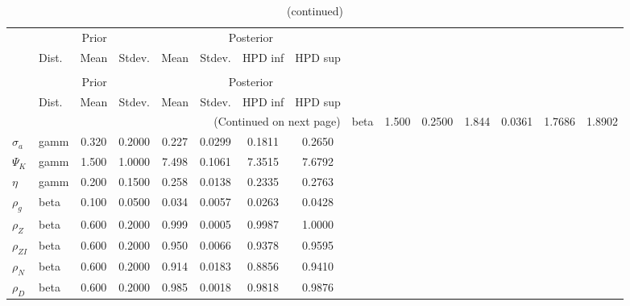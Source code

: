  
\begin{center}
\begin{longtable}{llcccccc} 
\caption{Results from Metropolis-Hastings (parameters)}
 \label{Table:MHPosterior:1}\\
\toprule 
  & \multicolumn{3}{c}{Prior}  &  \multicolumn{4}{c}{Posterior} \\
  \cmidrule(r{.75em}){2-4} \cmidrule(r{.75em}){5-8}
  & Dist. & Mean  & Stdev. & Mean & Stdev. & HPD inf & HPD sup\\
\midrule \endfirsthead 
\caption{(continued)}\\\toprule 
  & \multicolumn{3}{c}{Prior}  &  \multicolumn{4}{c}{Posterior} \\
  \cmidrule(r{.75em}){2-4} \cmidrule(r{.75em}){5-8}
  & Dist. & Mean  & Stdev. & Mean & Stdev. & HPD inf & HPD sup\\
\midrule \endhead 
\bottomrule \multicolumn{8}{r}{(Continued on next page)} \endfoot 
\bottomrule \endlastfoot 
${\gamma}$ & beta &   1.500 & 0.2500 &   1.844& 0.0361 &  1.7686 &  1.8902 \\ 
${\sigma_a}$ & gamm &   0.320 & 0.2000 &   0.227& 0.0299 &  0.1811 &  0.2650 \\ 
${\Psi_K}$ & gamm &   1.500 & 1.0000 &   7.498& 0.1061 &  7.3515 &  7.6792 \\ 
${\eta}$ & gamm &   0.200 & 0.1500 &   0.258& 0.0138 &  0.2335 &  0.2763 \\ 
${\rho_g}$ & beta &   0.100 & 0.0500 &   0.034& 0.0057 &  0.0263 &  0.0428 \\ 
${\rho_Z}$ & beta &   0.600 & 0.2000 &   0.999& 0.0005 &  0.9987 &  1.0000 \\ 
${\rho_{ZI}}$ & beta &   0.600 & 0.2000 &   0.950& 0.0066 &  0.9378 &  0.9595 \\ 
${\rho_N}$ & beta &   0.600 & 0.2000 &   0.914& 0.0183 &  0.8856 &  0.9410 \\ 
${\rho_D}$ & beta &   0.600 & 0.2000 &   0.985& 0.0018 &  0.9818 &  0.9876 \\ 
\end{longtable}
 \end{center}
